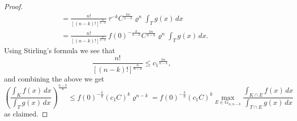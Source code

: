\documentclass[10pt,a4paper]{amsart}
\newcommand{\ls}{\leqslant}
\begin{document}
\begin{proof}
\begin{align*}
&= \frac{n!}{[(n-k)!]^{\frac{n}{n-k}}}\,\tau^{-k} C^{\frac{kn}{n-k}}\varrho^{n}
\int_Tg(x)\,dx\\
&= \frac{n!}{[(n-k)!]^{\frac{n}{n-k}}}\,f(0)^{-\frac{k}{n-k}} C^{\frac{kn}{n-k}}\varrho^{n}
\int_Tg(x)\,dx.
\end{align*}
Using Stirling's formula we see that
$$\frac{n!}{[(n-k)!]^{\frac{n}{n-k}}}\ls {c_1}^{\frac{kn}{n-k}},$$
and combining the above we get
$$\left(\frac{\int_Kf(x)\,dx}{\int_Tg(x)\,dx}\right)^{\frac{n-k}{n}}\ls f(0)^{-\frac{k}{n}}(c_1C)^k\varrho^{n-k}
=f(0)^{-\frac{k}{n}}(c_1C)^k\max_{E\in G_{n,n-k}} \frac{\int_{K\cap E} f(x)\,dx}{\int_{T\cap E} g(x)\,dx}$$
as claimed.\end{proof}
\end{document}
